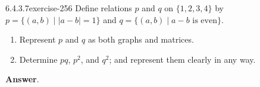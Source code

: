 \documentclass[twoside,10pt,]{book}
\numberwithin{equation}{section}
\begin{document}
\begin{divisionsolution}{6.4.3.7}{}{exercise-256}%
\hypertarget{p-2164}{}%
Define relations \(p\) and \(q\) on \(\{1, 2, 3, 4\}\) by \(p = \{(a, b) \mid \lvert a-b\rvert=1\}\) and \(q=\{(a,b) \mid a-b \textrm{ is even}\}\).%
\par
\hypertarget{p-2165}{}%
\leavevmode%
\begin{enumerate}[label=(\alph*)]
\item\hypertarget{li-1143}{}\hypertarget{p-2166}{}%
Represent \(p\) and \(q\) as both graphs and matrices.%
\item\hypertarget{li-1144}{}\hypertarget{p-2167}{}%
Determine \(p q\), \(p^2\), and \(q^2\); and represent them clearly in any way.%
\end{enumerate}
%
\par\smallskip%
\noindent\textbf{Answer}.\quad%
\hypertarget{p-2168}{}%
\leavevmode%
\end{divisionsolution}
\end{document}
